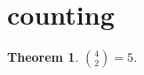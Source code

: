 \documentclass{article}
\newtheorem{theorem}{Theorem}
\begin{document}
\section{counting}

\begin{theorem}\label{thm:RC02}
$\binom{4}{2}=5$.
\end{theorem}
\end{document}
